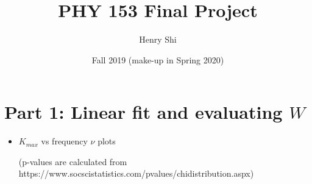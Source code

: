 \documentclass{article}
\title{PHY 153 Final Project}
\author{Henry Shi}
\date{Fall 2019 (make-up in Spring 2020)}
\begin{document}
\maketitle

\pagebreak


\section{Part 1: Linear fit and evaluating $W$}
\begin{itemize}
\item
  $K_{max}$ vs frequency $\nu$ plots

  (p-values are calculated from https://www.socscistatistics.com/pvalues/chidistribution.aspx)


\end{itemize}
\end{document}
